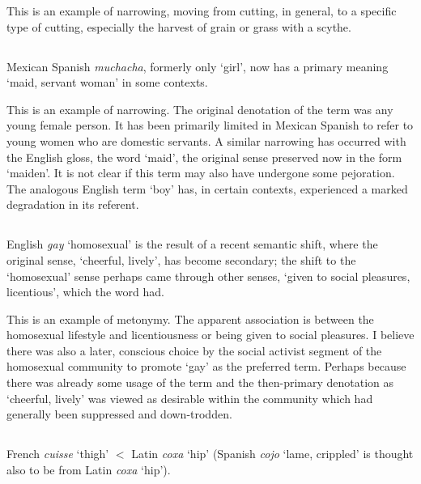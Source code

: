 \documentclass[12pt]{article}
\begin{document}
This is an example of narrowing, moving from cutting, in general, to a specific type of cutting, especially the harvest of grain or grass with a scythe.

\addtocounter{subsection}{+1}
\subsection{}

Mexican Spanish {\it muchacha}, formerly only `girl', now has a primary meaning `maid, servant woman' in some contexts.

This is an example of narrowing. The original denotation of the term was any young female person. It has been primarily limited in Mexican Spanish to refer to young women who are domestic servants. A similar narrowing has occurred with the English gloss, the word `maid', the original sense preserved now in the form `maiden'. It is not clear if this term may also have undergone some pejoration. The analogous English term `boy' has, in certain contexts, experienced a marked degradation in its referent.

\addtocounter{subsection}{+1}
\subsection{}

English {\it gay} `homosexual' is the result of a recent semantic shift, where the original sense, `cheerful, lively', has become secondary; the shift to the `homosexual' sense perhaps came through other senses, `given to social pleasures, licentious', which the word had.

This is an example of metonymy. The apparent association is between the homosexual lifestyle and licentiousness or being given to social pleasures. I believe there was also a later, conscious choice by the social activist segment of the homosexual community to promote `gay' as the preferred term. Perhaps because there was already some usage of the term and the then-primary denotation as `cheerful, lively' was viewed as desirable within the community which had generally been suppressed and down-trodden.

\addtocounter{subsection}{+1}
\subsection{}

French {\it cuisse} `thigh' $<$ Latin {\it coxa} `hip' (Spanish {\it cojo} `lame, crippled' is thought also to be from Latin {\it coxa} `hip').
\end{document}
